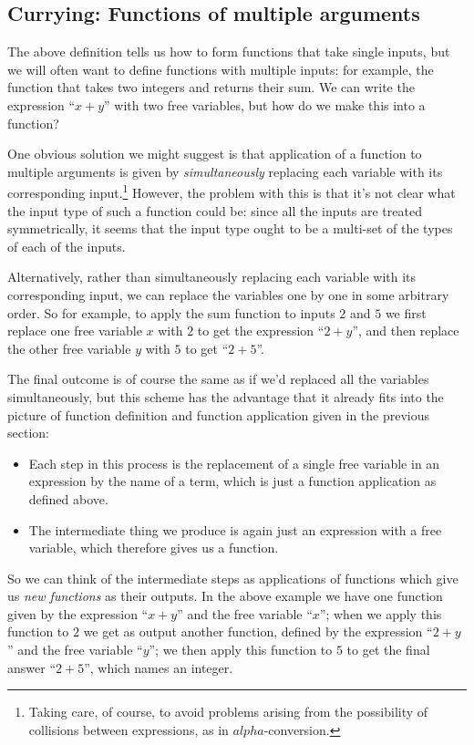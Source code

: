 \subsection{Currying: Functions of multiple arguments}

The above definition tells us how to form functions that take single inputs, but we will often want to define functions with multiple inputs: for example, the function that takes two integers and returns their sum.  We can write the expression ``$x + y$'' with two free variables, but how do we make this into a function?

One obvious solution we might suggest is that 
application of a function to multiple arguments is given by \emph{simultaneously} replacing each variable with its corresponding input.\footnote{
Taking care, of course, to avoid problems arising from the possibility of collisions between expressions, as in $alpha$-conversion.
}
However, the problem with this is that it's not clear what the input type of such a function could be: since all the inputs are treated symmetrically, it seems that the input type ought to be a multi-set of the types of each of the inputs.

Alternatively, rather than simultaneously replacing each variable with its corresponding input, we can replace the variables one by one in some arbitrary order.  So for example, to apply the sum function to inputs $2$ and $5$ we first replace one free variable $x$ with $2$ to get the expression ``$2 + y$'', and then replace the other free variable $y$ with $5$ to get ``$2+5$''.  

The final outcome is of course the same as if we'd replaced all the variables simultaneously, but this scheme has the advantage that it already fits into the picture of function definition and function application given in the previous section:
\begin{itemize}
\item 
Each step in this process is the replacement of a single free variable in an expression by the name of a term, which is just a function application as defined above.
\item 
The intermediate thing we produce is again just an expression with a free variable, which therefore gives us a function.  
\end{itemize}
So we can think of the intermediate steps as applications of functions which give us \emph{new functions} as their outputs.  In the above example we have one function given by the expression ``$x + y$'' and the free variable ``$x$''; when we apply this function to $2$ we get as output another function, defined by the expression ``$2 + y$'' and the free variable ``$y$''; we then apply this function to $5$ to get the final answer ``$2 + 5$'', which names an integer.

